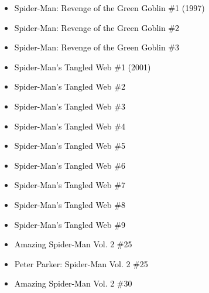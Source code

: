 \documentclass[12pt]{article}
\newcommand{\checkbox}{\raisebox{0.0ex}{\fbox{\rule{0ex}{1.5ex} \rule{1.5ex}{0ex}}}}
\begin{document}
\begin{center}
\begin{tcolorbox}[colback=white!95!gray, colframe=black, width=0.9\textwidth, arc=4mm, auto outer arc, boxrule=0.8pt]
\begin{itemize}[left=0pt,label={\checkbox}]
    \item \textcolor{black}{Spider-Man: Revenge of the Green Goblin \#1 (1997)}
    \item \textcolor{black}{Spider-Man: Revenge of the Green Goblin \#2}
    \item \textcolor{black}{Spider-Man: Revenge of the Green Goblin \#3}
    \item \textcolor{black}{Spider-Man’s Tangled Web \#1 (2001)}
    \item \textcolor{black}{Spider-Man’s Tangled Web \#2}
    \item \textcolor{black}{Spider-Man’s Tangled Web \#3}
    \item \textcolor{black}{Spider-Man’s Tangled Web \#4}
    \item \textcolor{black}{Spider-Man’s Tangled Web \#5}
    \item \textcolor{black}{Spider-Man’s Tangled Web \#6}
    \item \textcolor{black}{Spider-Man’s Tangled Web \#7}
    \item \textcolor{black}{Spider-Man’s Tangled Web \#8}
    \item \textcolor{black}{Spider-Man’s Tangled Web \#9}
    \item \textcolor{black}{Amazing Spider-Man Vol. 2 \#25}
    \item \textcolor{black}{Peter Parker: Spider-Man Vol. 2 \#25}
    \item \textcolor{black}{Amazing Spider-Man Vol. 2 \#30}
\end{itemize}
\end{tcolorbox}
\end{center}
\end{document}
